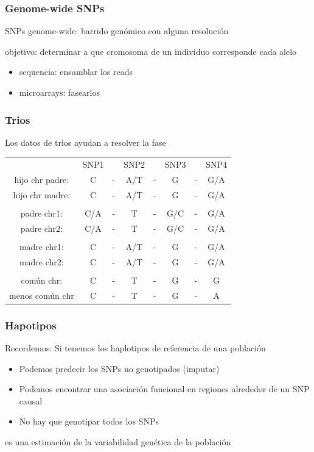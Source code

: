 \documentclass{beamer}\usepackage[]{graphicx}\usepackage[]{color}
\begin{document}
\begin{frame}[fragile]
\frametitle{Genome-wide SNPs}
SNPs genome-wide: barrido gen\'omico con alguna resoluci\'on

objetivo: determinar a que cromosoma de un individuo corresponde cada alelo

\begin{itemize}
\item sequencia: ensamblar los reads
\item microarrays: fasearlos 
\end{itemize}
\end{frame}


\begin{frame}[fragile]
\frametitle{Trios}
Los datos de trios ayudan a resolver la fase
\begin{table}[]
\centering
\begin{tabular}{cccccccc}
      &SNP1& &SNP2 & & SNP3 &  & SNP4\\
hijo chr padre: &C   &-&  A/T&-& G &-& G/A\\
hijo chr madre: &C   &-&  A/T&-& G &-& G/A\\ 
& & & &\\
padre chr1: &C/A   &-&  T&-& G/C &-& G/A\\
padre chr2: &C/A   &-&  T&-& G/C &-& G/A\\ 
& & & &\\
madre chr1: &C   &-&  A/T&-& G &-& G/A \\
madre chr2: &C   &-&  A/T&-& G &-& G/A\\ 
& & & &\\
com\'un chr: & C  &-&  T &-& G &-& G\\
menos com\'un chr & C  &-&  T &-& G &-& A\\
\end{tabular}
\end{table}
\end{frame}


\begin{frame}[fragile]
\frametitle{Hapotipos}

Recordemos: Si tenemos los haplotipos de referencia de una poblaci\'on
\begin{itemize}
\item Podemos predecir los SNPs no genotipados (imputar)
\item Podemos encontrar una asociaci\'on funcional en regiones alrededor de un SNP causal
\item No hay que genotipar todos los SNPs
\end{itemize}
es una estimaci\'on de la variabilidad gen\'etica de la poblaci\'on

\end{frame}
\end{document}
